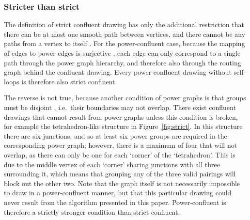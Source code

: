 \subsubsection{Stricter than strict}
The definition of strict confluent drawing has only the additional restriction that there can be at most one smooth path between vertices, and there cannot be any paths from a vertex to itself \cite{Eppstein2013}. 
For the power-confluent case, because the mapping of edges to power edges is surjective \cite{Royer2008}, each edge can only correspond to a single path through the power graph hierarchy, and therefore also through the routing graph behind the confluent drawing. Every power-confluent drawing without self-loops is therefore also strict confluent.

The reverse is not true, because another condition of power graphs is that groups must be disjoint \cite{Royer2008}, i.e.\ their boundaries may not overlap.
There exist confluent drawings that cannot result from power graphs unless this condition is broken, for example the tetrahedron-like structure in Figure~\ref{fig:strict}.
In this structure there are six junctions, and so at least six power groups are required in the corresponding power graph; however, there is a maximum of four that will not overlap, as there can only be one for each `corner' of the `tetrahedron'. This is due to the middle vertex of each `corner' sharing junctions with all three surrounding it, which means that grouping any of the three valid pairings will block out the other two.
Note that the graph itself is not necessarily impossible to draw in a power-confluent manner, but that this particular drawing could never result from the algorithm presented in this paper.
Power-confluent is therefore a strictly stronger condition than strict confluent.

